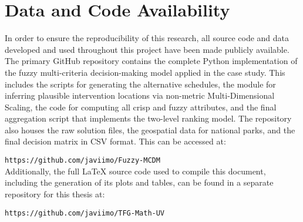 \newpage
\section*{Data and Code Availability}

In order to ensure the reproducibility of this research, all source code and data developed and used throughout this project have been made publicly available.\\

The primary GitHub repository contains the complete Python implementation of the fuzzy multi-criteria decision-making model applied in the case study. This includes the scripts for generating the alternative schedules, the module for inferring plausible intervention locations via non-metric Multi-Dimensional Scaling, the code for computing all crisp and fuzzy attributes, and the final aggregation script that implements the two-level ranking model. The repository also houses the raw solution files, the geospatial data for national parks, and the final decision matrix in CSV format. This can be accessed at:

\texttt{https://github.com/javiimo/Fuzzy-MCDM}\\

Additionally, the full LaTeX source code used to compile this document, including the generation of its plots and tables, can be found in a separate repository for this thesis at:

\texttt{https://github.com/javiimo/TFG-Math-UV}